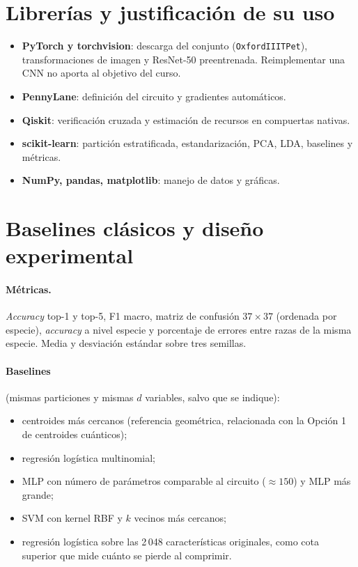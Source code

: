 \documentclass[11pt,letterpaper]{article}
\begin{document}
\section{Librerías y justificación de su uso}
\begin{itemize}[leftmargin=*]
\item \textbf{PyTorch y torchvision}: descarga del conjunto (\texttt{OxfordIIITPet}), transformaciones de
imagen y ResNet-50 preentrenada. Reimplementar una CNN no aporta al objetivo del curso.
\item \textbf{PennyLane}: definición del circuito y gradientes automáticos.
\item \textbf{Qiskit}: verificación cruzada y estimación de recursos en compuertas nativas.
\item \textbf{scikit-learn}: partición estratificada, estandarización, PCA, LDA, baselines y métricas.
\item \textbf{NumPy, pandas, matplotlib}: manejo de datos y gráficas.
\end{itemize}

\section{Baselines clásicos y diseño experimental}
\paragraph{Métricas.} \emph{Accuracy} top-1 y top-5, F1 macro, matriz de confusión $37\times37$
(ordenada por especie), \emph{accuracy} a nivel especie y porcentaje de errores entre razas de la misma
especie. Media y desviación estándar sobre tres semillas.

\paragraph{Baselines} (mismas particiones y mismas $d$ variables, salvo que se indique):
\begin{itemize}[leftmargin=*]
\item centroides más cercanos (referencia geométrica, relacionada con la Opción 1 de centroides cuánticos);
\item regresión logística multinomial;
\item MLP con número de parámetros comparable al circuito ($\approx150$) y MLP más grande;
\item SVM con kernel RBF y $k$ vecinos más cercanos;
\item regresión logística sobre las 2\,048 características originales, como cota superior que mide
cuánto se pierde al comprimir.
\end{itemize}
\end{document}
